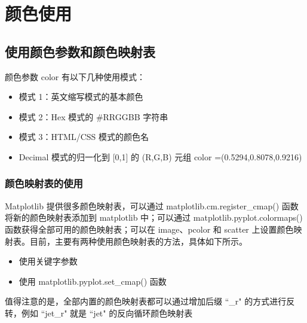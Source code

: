 \chapter{颜色使用\label{ch12}}
\section{使用颜色参数和颜色映射表}
颜色参数 color 有以下几种使用模式：
\begin{itemize}
    \item 模式 1：英文缩写模式的基本颜色
    \item 模式 2：Hex 模式的 \#RRGGBB 字符串
    \item 模式 3：HTML/CSS 模式的颜色名
    \item Decimal 模式的归一化到 [0,1] 的 (R,G,B) 元组 color =(0.5294,0.8078,0.9216)
\end{itemize}
\subsection{颜色映射表的使用}
Matplotlib 提供很多颜色映射表，可以通过 matplotlib.cm.register\_cmap() 函数将新的颜色映射表添加到 matplotlib 中；可以通过 matplotlib.pyplot.colormaps() 函数获得全部可用的颜色映射表；可以在 image、pcolor 和 scatter 上设置颜色映射表。目前，主要有两种使用颜色映射表的方法，具体如下所示。
\begin{itemize}
    \item 使用关键字参数
    \item 使用 matplotlib.pyplot.set\_cmap() 函数
\end{itemize}

值得注意的是，全部内置的颜色映射表都可以通过增加后缀 ``\_r" 的方式进行反转，例如 ``jet\_r" 就是 ``jet" 的反向循环颜色映射表